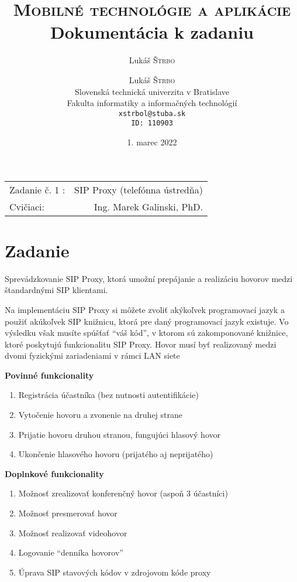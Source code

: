 \documentclass[10pt,oneside,slovak,a4paper]{article}
\title{\textsc{Mobilné technológie a aplikácie}\\ Dokumentácia k zadaniu} %
\author{Lukáš \textsc{Štrbo}} %
\date{1. marec 2022}
\author{Lukáš \textsc{Štrbo}\\[2pt]
	{\small Slovenská technická univerzita v Bratislave}\\
	{\small Fakulta informatiky a informačných technológií}\\
	{\small \texttt{xstrbol@stuba.sk}}\\
{\small \texttt{ID: 110903}}\\
	}
\begin{document}
\maketitle %

\begin{center}
\begin{tabular}{l r}
Zadanie č. 1 : & SIP Proxy (telefónna ústredňa)\\ 
Cvičiaci: & Ing. Marek Galinski, PhD.
\end{tabular}
\end{center}

\section{Zadanie}
Sprevádzkovanie SIP Proxy, ktorá umožní prepájanie a realizáciu hovorov medzi štandardnými SIP klientami.

Na implementáciu SIP Proxy si môžete zvoliť akýkoľvek programovací jazyk a použiť akúkoľvek SIP knižnicu, ktorá pre daný programovací jazyk existuje. Vo výsledku však musíte spúšťať “váš kód”, v ktorom sú zakomponované knižnice, ktoré poskytujú funkcionalitu SIP Proxy. Hovor musí byť realizovaný medzi dvomi fyzickými zariadeniami v rámci LAN siete


\textbf{Povinné funkcionality}
\begin{enumerate}[label=(\alph*)]
	\item Registrácia účastníka (bez nutnosti autentifikácie) 
	\item Vytočenie hovoru a zvonenie na druhej strane 
	\item Prijatie hovoru druhou stranou, fungujúci hlasový hovor 
	\item Ukončenie hlasového hovoru (prijatého aj neprijatého) 
\end{enumerate}


\textbf{Doplnkové funkcionality}
\begin{enumerate}[label=(\alph*)]
	\item Možnosť zrealizovať konferenčný hovor (aspoň 3 účastníci) 
	\item Možnosť presmerovať hovor 
	\item Možnosť realizovať videohovor 
	\item Logovanie “denníka hovorov”
	\item Úprava SIP stavových kódov v zdrojovom kóde proxy
\end{enumerate}
\end{document}
